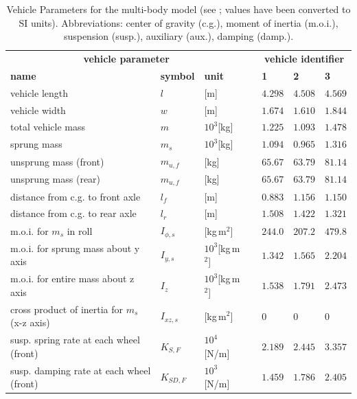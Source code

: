 \documentclass[11pt,a4paper]{article}
\renewcommand{\^}[1]{^{(#1)}}
\renewcommand{\a}{l_f} %
\renewcommand{\b}{l_r} %
\begin{document}
\begin{table}[h!tb]
\caption{Vehicle Parameters for the multi-body model (see \cite[Table~E-5.]{Allen1992}; values have been converted to SI units). Abbreviations: center of gravity (c.g.), moment of inertia (m.o.i.), suspension (susp.), auxiliary (aux.), damping (damp.).}
{\small
\begin{center}\label{tab:vehicleParametersMB}
\begin{tabular}{lllclll}
	\toprule
	\multicolumn{3}{c}{\textbf{vehicle parameter}} & \phantom{a} & \multicolumn{3}{c}{\textbf{vehicle identifier}} \\ \cmidrule{1-3} \cmidrule{5-7} 
	\textbf{name} & \textbf{symbol} & \textbf{unit} && \textbf{1} & \textbf{2} & \textbf{3}  \\ \hline
	vehicle length & $l$ & [m] && $4.298$ & $4.508$ & $4.569$ \\
	vehicle width & $w$ & [m] && $1.674$ & $1.610$ & $1.844$ \\
	total vehicle mass & $m$ & $10^3$[kg] && $1.225$ & $1.093$ & $1.478$ \\ %
	sprung mass & $m_s$ & $10^3$[kg] && $1.094$ & $0.965$ & $1.316$ \\ %
	unsprung mass (front) & $m_{u,f}$ & [kg] && $65.67$ & $63.79$ & $81.14$ \\ %
	unsprung mass (rear) & $m_{u,f}$ & [kg] && $65.67$ & $63.79$ & $81.14$ \\ %
	distance from c.g. to front axle & $\a$ & [m] && $0.883$ & $1.156$ & $1.150$ \\ %
	distance from c.g. to rear axle & $\b$ & [m] && $1.508$ & $1.422$ & $1.321$ \\ %
	m.o.i. for $m_s$ in roll & $I_{\phi,s}$ & [kg\,m$^2$] && $244.0$ & $207.2$ & $479.8$ \\ %
	m.o.i. for sprung mass about y axis & $I_{y,s}$ & $10^3$[kg\,m$^2$] && $1.342$ & $1.565$ & $2.204$ \\ %
	m.o.i. for entire mass about z axis & $I_z$ & $10^3$[kg\,m$^2$] && $1.538$ & $1.791$ & $2.473$ \\ %
	cross product of inertia for $m_s$ (x-z axis) & $I_{xz,s}$ & [kg\,m$^2$] && $0$ & $0$ & $0$ \\ %
	susp. spring rate at each wheel (front) & $K_{S,F}$ & $10^4$[N/m] && $ 2.189$ & $2.445$ & $3.357$ \\ %
	susp. damping rate at each wheel (front) & $K_{SD,F}$ & $10^3$[N/m] && $1.459$ & $1.786$ & $2.405$ \\ %

\end{tabular}
\end{center}}
\end{table}
\end{document}
